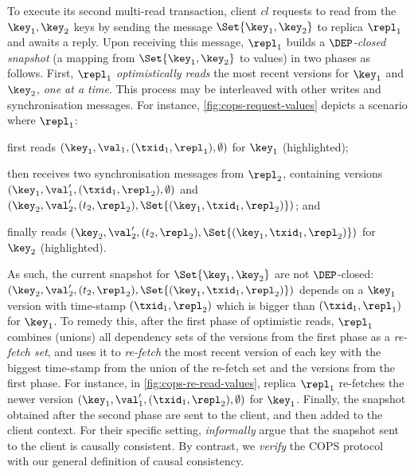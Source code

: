 To execute its second multi-read transaction,
client  \( cl \) requests to read from the $\key_1, \key_2$ keys by sending the message 
\( \Set{\key_1, \key_2} \) to replica $\repl_1$ and awaits a reply.
Upon receiving this message, $\repl_1$ builds a \emph{\( \DEP \)-closed snapshot} (a mapping from $\Set{\key_1, \key_2}$ to values) in two phases as follows. 
First, $\repl_1$ \emph{optimistically reads} the most recent versions for $\key_1$ and $\key_2$,
\emph{one at a time}. 
This process may be interleaved with other writes and synchronisation messages. 
For instance, \cref{fig:cops-request-values} depicts a scenario where \( \repl_1 \):
\begin{enumerate*}
	\item first reads \( (\key_1,\val_1,(\txid_1,\repl_1), \emptyset) \) for $\key_1$ (highlighted); %
	\item then receives two synchronisation messages from \( \repl_2 \), 
containing versions \( ( \key_1, \val'_1, (\txid_1,\repl_2),\emptyset ) \) and \( ( \key_2, \val'_2, (t_2,\repl_2),\Set{(\key_1,\txid_1,\repl_2)} ) \); and
	\item finally reads \( ( \key_2, \val'_2, (t_2,\repl_2),\Set{(\key_1,\txid_1,\repl_2)} ) \) for $\key_2$ (highlighted).
\end{enumerate*}
As such, the current snapshot for \( \Set{\key_1,\key_2}\) are not \( \DEP \)-closed: 
\( ( \key_2, \val'_2, (t_2,\repl_2),\Set{(\key_1,\txid_1,\repl_2)} ) \) depends on 
a $\key_1$ version with time-stamp $(\txid_1, \repl_2)$ which is bigger than $(\txid_1, \repl_1)$ for $\key_1$.
To remedy this, after the first phase of optimistic reads,
$\repl_1$ combines (unions) all dependency sets of the versions from the first phase as a \emph{re-fetch set},
and uses it to \emph{re-fetch}
the most recent version of each key with the biggest time-stamp 
from the union of the re-fetch set and the versions from the first phase.
For instance, in \cref{fig:cops-re-read-values}, replica $\repl_1$ re-fetches 
the newer version \( ( \key_1, \val'_1, (\txid_1,\repl_2),\emptyset ) \) for \( \key_1 \).
Finally, the snapshot obtained after the second phase 
are sent to the client, and then added to the client context.
For their specific setting, \citet{cops} \emph{informally} argue that the snapshot sent to the client is causally consistent.
By contrast, we \emph{verify} the COPS protocol with our general definition of causal consistency.


